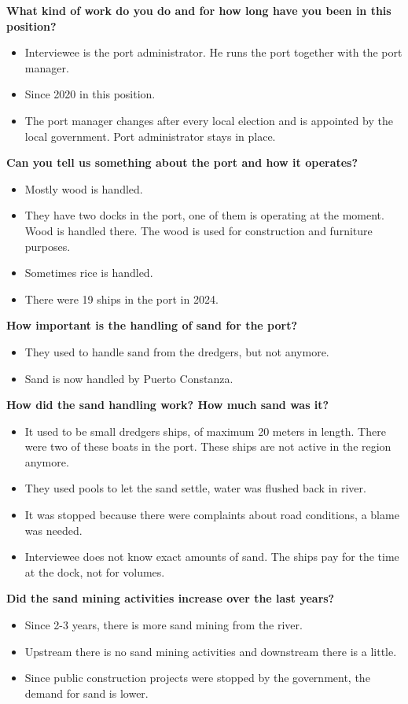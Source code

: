 \textbf{What kind of work do you do and for how long have you been in this position?}
\begin{itemize}
    \item Interviewee is the port administrator. He runs the port together with the port manager.
    \item Since 2020 in this position.
    \item The port manager changes after every local election and is appointed by the local government. Port administrator stays in place.
\end{itemize}

\textbf{Can you tell us something about the port and how it operates?}
\begin{itemize}
    \item Mostly wood is handled.
    \item They have two docks in the port, one of them is operating at the moment. Wood is handled there. The wood is used for construction and furniture purposes.
    \item Sometimes rice is handled.
    \item There were 19 ships in the port in 2024.
\end{itemize}

\textbf{How important is the handling of sand for the port?}
\begin{itemize}
    \item They used to handle sand from the dredgers, but not anymore.
    \item Sand is now handled by Puerto Constanza.
\end{itemize}

\textbf{How did the sand handling work? How much sand was it?}
\begin{itemize}
    \item It used to be small dredgers ships, of maximum 20 meters in length. There were two of these boats in the port. These ships are not active in the region anymore.
    \item They used pools to let the sand settle, water was flushed back in river.
    \item It was stopped because there were complaints about road conditions, a blame was needed.
    \item Interviewee does not know exact amounts of sand. The ships pay for the time at the dock, not for volumes.
\end{itemize}

\textbf{Did the sand mining activities increase over the last years?}
\begin{itemize}
    \item Since 2-3 years, there is more sand mining from the river.
    \item Upstream there is no sand mining activities and downstream there is a little.
    \item Since public construction projects were stopped by the government, the demand for sand is lower.
\end{itemize}

